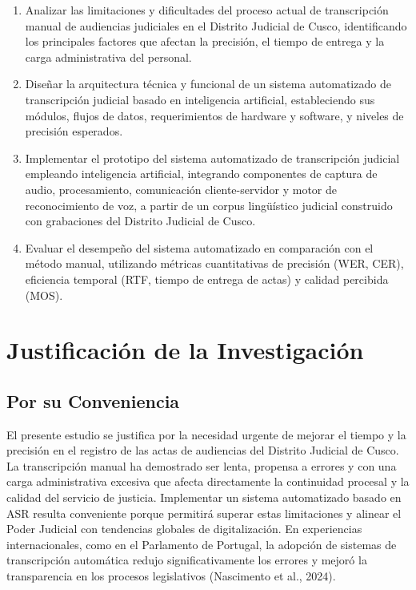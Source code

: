 \documentclass[12pt,a4paper,oneside]{report}
\begin{document}
\begin{enumerate}[label=\alph*)]
  \item Analizar las limitaciones y dificultades del proceso actual de transcripción manual de audiencias judiciales en el Distrito Judicial de Cusco, identificando los principales factores que afectan la precisión, el tiempo de entrega y la carga administrativa del personal.
  \item Diseñar la arquitectura técnica y funcional de un sistema automatizado de transcripción judicial basado en inteligencia artificial, estableciendo sus módulos, flujos de datos, requerimientos de hardware y software, y niveles de precisión esperados.
  \item Implementar el prototipo del sistema automatizado de transcripción judicial empleando inteligencia artificial, integrando componentes de captura de audio, procesamiento, comunicación cliente-servidor y motor de reconocimiento de voz, a partir de un corpus lingüístico judicial construido con grabaciones del Distrito Judicial de Cusco.
  \item Evaluar el desempeño del sistema automatizado en comparación con el método manual, utilizando métricas cuantitativas de precisión (WER, CER), eficiencia temporal (RTF, tiempo de entrega de actas) y calidad percibida (MOS).
\end{enumerate}

\section{Justificación de la Investigación}

\subsection{Por su Conveniencia}

El presente estudio se justifica por la necesidad urgente de mejorar el tiempo y la precisión en el registro de las actas de audiencias del Distrito Judicial de Cusco. La transcripción manual ha demostrado ser lenta, propensa a errores y con una carga administrativa excesiva que afecta directamente la continuidad procesal y la calidad del servicio de justicia. Implementar un sistema automatizado basado en ASR resulta conveniente porque permitirá superar estas limitaciones y alinear el Poder Judicial con tendencias globales de digitalización. En experiencias internacionales, como en el Parlamento de Portugal, la adopción de sistemas de transcripción automática redujo significativamente los errores y mejoró la transparencia en los procesos legislativos (Nascimento et al., 2024).
\end{document}
